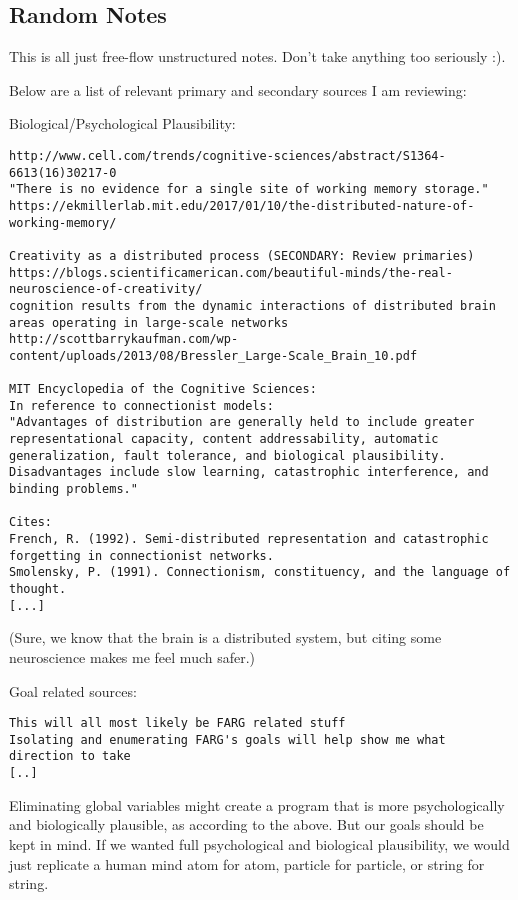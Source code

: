 \subsection{Random Notes}

This is all just free-flow unstructured notes. Don't take anything too seriously :).

Below are a list of relevant primary and secondary sources I am reviewing:

Biological/Psychological Plausibility:
\begin{verbatim}
http://www.cell.com/trends/cognitive-sciences/abstract/S1364-6613(16)30217-0
"There is no evidence for a single site of working memory storage."
https://ekmillerlab.mit.edu/2017/01/10/the-distributed-nature-of-working-memory/

Creativity as a distributed process (SECONDARY: Review primaries)
https://blogs.scientificamerican.com/beautiful-minds/the-real-neuroscience-of-creativity/
cognition results from the dynamic interactions of distributed brain areas operating in large-scale networks
http://scottbarrykaufman.com/wp-content/uploads/2013/08/Bressler_Large-Scale_Brain_10.pdf

MIT Encyclopedia of the Cognitive Sciences:
In reference to connectionist models:
"Advantages of distribution are generally held to include greater representational capacity, content addressability, automatic generalization, fault tolerance, and biological plausibility. Disadvantages include slow learning, catastrophic interference, and binding problems."

Cites:
French, R. (1992). Semi-distributed representation and catastrophic forgetting in connectionist networks.
Smolensky, P. (1991). Connectionism, constituency, and the language of thought.
[...]
\end{verbatim}

(Sure, we know that the brain is a distributed system, but citing some neuroscience makes me feel much safer.)

Goal related sources:
\begin{verbatim}
This will all most likely be FARG related stuff
Isolating and enumerating FARG's goals will help show me what direction to take
[..]
\end{verbatim}

Eliminating global variables might create a program that is more psychologically and biologically plausible, as according to the above. But our goals should be kept in mind. If we wanted full psychological and biological plausibility, we would just replicate a human mind atom for atom, particle for particle, or string for string. 

